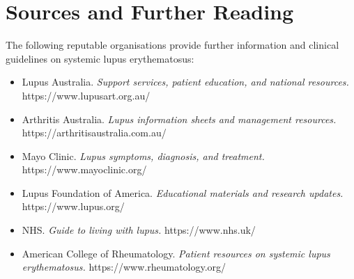 \section*{Sources and Further Reading}
The following reputable organisations provide further information and clinical guidelines on systemic lupus erythematosus:
\begin{itemize}
    \item Lupus Australia. \textit{Support services, patient education, and national resources.} https://www.lupusart.org.au/
    \item Arthritis Australia. \textit{Lupus information sheets and management resources.} https://arthritisaustralia.com.au/
    \item Mayo Clinic. \textit{Lupus symptoms, diagnosis, and treatment.} https://www.mayoclinic.org/
    \item Lupus Foundation of America. \textit{Educational materials and research updates.} https://www.lupus.org/
    \item NHS. \textit{Guide to living with lupus.} https://www.nhs.uk/
    \item American College of Rheumatology. \textit{Patient resources on systemic lupus erythematosus.} https://www.rheumatology.org/
\end{itemize}
